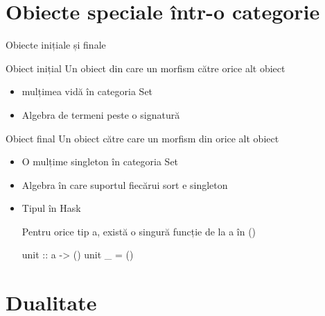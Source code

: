 \documentclass[xcolor=pdftex,romanian,colorlinks]{beamer}
\begin{document}
\section{Obiecte speciale într-o categorie}

\begin{frame}[fragile]{Obiecte inițiale și finale}
\begin{block}{Obiect inițial}
Un obiect din care  un  morfism către orice alt obiect
\begin{itemize}
\item mulțimea vidă în categoria Set
\item Algebra de termeni peste o signatură
\end{itemize}
\end{block}
\begin{block}{Obiect final}
Un obiect către care  un  morfism din orice alt obiect
\begin{itemize}
\item O mulțime singleton în categoria Set
\item Algebra în care suportul fiecărui sort e singleton
\item Tipul \structure{()} în Hask

Pentru orice tip a, există o singură funcție de la a în ()
\begin{asciihs}
    unit :: a -> ()
    unit _ = ()
\end{asciihs}
\end{itemize}
\end{block}
\end{frame}

\section{Dualitate}
\end{document}
